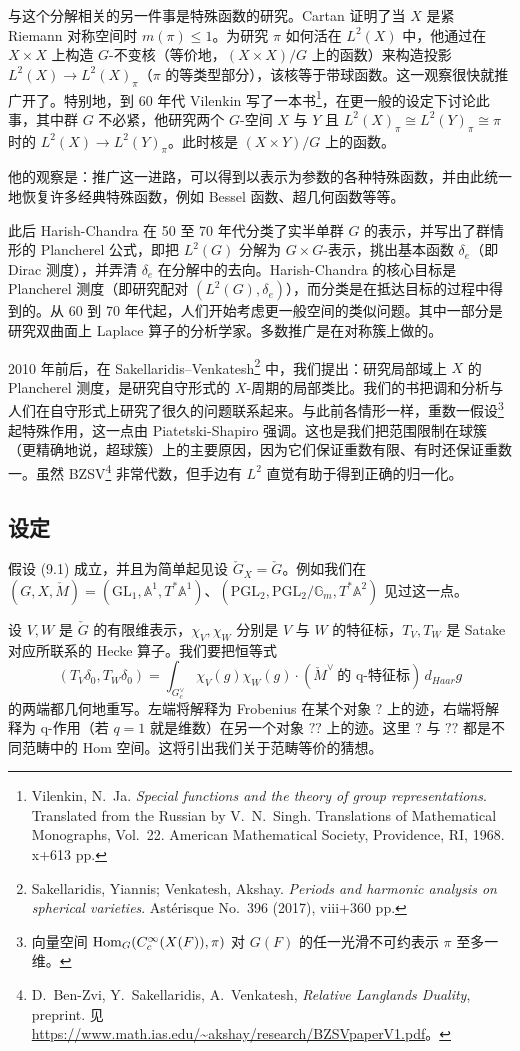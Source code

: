 与这个分解相关的另一件事是特殊函数的研究。Cartan 证明了当 $X$ 是紧 Riemann 对称空间时 $m(\pi)\le1$。为研究 $\pi$ 如何活在 $L^2(X)$ 中，他通过在 $X\times X$ 上构造 $G$-不变核（等价地，$(X\times X)/G$ 上的函数）来构造投影 $L^2(X)\to L^2(X)_\pi$（$\pi$ 的等类型部分），该核等于带球函数。这一观察很快就推广开了。特别地，到 60 年代 Vilenkin 写了一本书\footnote{Vilenkin, N.~Ja. \emph{Special functions and the theory of group representations}. Translated from the Russian by V.~N.~Singh. Translations of Mathematical Monographs, Vol.\ 22. American Mathematical Society, Providence, RI, 1968. x+613 pp.}，在更一般的设定下讨论此事，其中群 $G$ 不必紧，他研究两个 $G$-空间 $X$ 与 $Y$ 且 $L^2(X)_\pi\cong L^2(Y)_\pi\cong\pi$ 时的 $L^2(X)\to L^2(Y)_\pi$。此时核是 $(X\times Y)/G$ 上的函数。

他的观察是：推广这一进路，可以得到以表示为参数的各种特殊函数，并由此统一地恢复许多经典特殊函数，例如 Bessel 函数、超几何函数等等。

此后 Harish-Chandra 在 50 至 70 年代分类了实半单群 $G$ 的表示，并写出了群情形的 Plancherel 公式，即把 $L^2(G)$ 分解为 $G\times G$-表示，挑出基本函数 $\delta_e$（即 Dirac 测度），并弄清 $\delta_e$ 在分解中的去向。Harish-Chandra 的核心目标是 Plancherel 测度（即研究配对 $(L^2(G),\delta_e)$），而分类是在抵达目标的过程中得到的。从 60 到 70 年代起，人们开始考虑更一般空间的类似问题。其中一部分是研究双曲面上 Laplace 算子的分析学家。多数推广是在对称簇上做的。

2010 年前后，在 Sakellaridis--Venkatesh\footnote{Sakellaridis, Yiannis; Venkatesh, Akshay. \emph{Periods and harmonic analysis on spherical varieties}. Astérisque No.\ 396 (2017), viii+360 pp.} 中，我们提出：研究局部域上 $X$ 的 Plancherel 测度，是研究自守形式的 $X$-周期的局部类比。我们的书把调和分析与人们在自守形式上研究了很久的问题联系起来。与此前各情形一样，重数一假设\footnote{向量空间 $\operatorname{Hom}_G(C_c^\infty(X(F)),\pi)$ 对 $G(F)$ 的任一光滑不可约表示 $\pi$ 至多一维。}起特殊作用，这一点由 Piatetski-Shapiro 强调。这也是我们把范围限制在球簇（更精确地说，超球簇）上的主要原因，因为它们保证重数有限、有时还保证重数一。虽然 BZSV\footnote{D.~Ben-Zvi, Y.~Sakellaridis, A.~Venkatesh, \emph{Relative Langlands Duality}, preprint. 见 \url{https://www.math.ias.edu/~akshay/research/BZSVpaperV1.pdf}。} 非常代数，但手边有 $L^2$ 直觉有助于得到正确的归一化。

\subsection{设定}

假设 (9.1) 成立，并且为简单起见设 $\check G_X=\check G$。例如我们在 $(G,X,\check M)=(\mathrm{GL}_1,\mathbb A^1,T^*\mathbb A^1)$、$(\mathrm{PGL}_2,\mathrm{PGL}_2/\mathbb G_m,T^*\mathbb A^2)$ 见过这一点。

设 $V,W$ 是 $\check G$ 的有限维表示，$\chi_V,\chi_W$ 分别是 $V$ 与 $W$ 的特征标，$T_V,T_W$ 是 Satake 对应所联系的 Hecke 算子。我们要把恒等式
\[
  (T_V\delta_0,T_W\delta_0)=\int_{G^\vee_c}\chi_V(g)\chi_W(g)\cdot(\check M^\vee\ \text{的 q-特征标})\,d_{Haar}g
\]
的两端都几何地重写。左端将解释为 Frobenius 在某个对象 $?$ 上的迹，右端将解释为 q-作用（若 $q=1$ 就是维数）在另一个对象 $??$ 上的迹。这里 $?$ 与 $??$ 都是不同范畴中的 Hom 空间。这将引出我们关于范畴等价的猜想。
